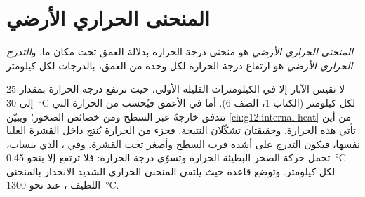 \section{المنحنى الحراري الأرضي}

\begin{definition}\label{def:g11:lithosphere-asthenosphere:geotherm}
\emph{المنحنى الحراري الأرضي} هو منحنى درجة الحرارة بدلالة العمق
تحت مكان ما. و\emph{التدرج الحراري الأرضي} هو
ارتفاع درجة الحرارة لكل وحدة من العمق، بالدرجات لكل كيلومتر.
\end{definition}

لا تقيس الآبار  إلا في الكيلومترات القليلة الأولى، حيث
ترتفع درجة الحرارة بمقدار 25 إلى \qty{30}{\celsius} لكل كيلومتر (الكتاب 1،
الصف 6). أما في الأعمق فيُحسب من الحرارة التي تتدفق خارجةً عبر
السطح ومن خصائص الصخور؛ ويبيّن \cref{ch:g12:internal-heat}
من أين تأتي هذه الحرارة. وحقيقتان تشكّلان النتيجة. فجزء من
الحرارة يُنتج داخل القشرة العليا نفسها، فيكون التدرج على أشده قرب
السطح وأصغر تحت القشرة. وفي ، الذي
ينساب، تحمل حركة الصخر البطيئة الحرارة وتسوّي
درجة الحرارة: فلا ترتفع إلا بنحو \qty{0.45}{\celsius} لكل كيلومتر. وتوضع
قاعدة  حيث يلتقي المنحنى الحراري الشديد الانحدار 
بالمنحنى اللطيف ، عند نحو \qty{1300}{\celsius}.

